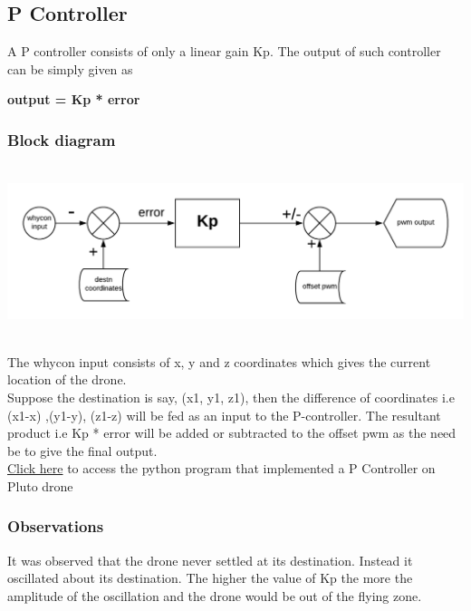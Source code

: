 \documentclass[a4paper,12pt,oneside]{book}
\begin{document}
\subsection{P Controller}
A P controller consists of only a linear gain Kp. The output of such controller can be simply given as 
\begin{center}
\textbf{output  = Kp * error}
\end{center}   
 
\subsubsection{\textbf{Block diagram}}
\includegraphics[width = 15cm , height= 5cm]{P.png}

The whycon input consists of x, y and z coordinates which gives the current location of the drone.\\
Suppose the destination is say, (x1, y1, z1), then the difference of coordinates i.e (x1-x) ,(y1-y), (z1-z) will be fed as an input to the P-controller.
The resultant product i.e Kp * error will be added or subtracted to the offset pwm as the need be to give the final output.\\


\href{https://github.com/eYSIP-2018/Autotuning-of-Controller-For-Drone/blob/karthik/P-controller.py}{Click here} to access the python program that implemented a P Controller on Pluto drone\\

\subsubsection{\textbf{Observations}}
It was observed that the drone never settled at its destination. Instead it oscillated about its destination.
The higher the value of Kp the more the amplitude of the oscillation and the drone would be out of the flying zone.\\
\end{document}
